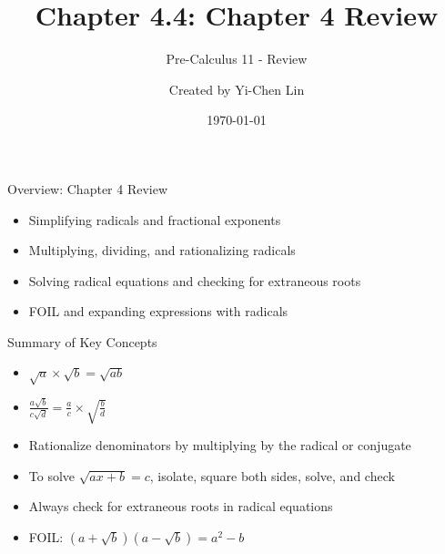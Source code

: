 \documentclass[aspectratio=169]{beamer}
\title{Chapter 4.4: Chapter 4 Review}
\subtitle{Pre-Calculus 11 - Review}
\author{Created by Yi-Chen Lin}
\date{\today}
\begin{document}
\begin{frame}
\titlepage
\end{frame}

\begin{frame}{Overview: Chapter 4 Review}
\begin{tcolorbox}[colback=lightgray,colframe=primary,title=Key Concepts]
\footnotesize
\begin{itemize}
  \item Simplifying radicals and fractional exponents
  \item Multiplying, dividing, and rationalizing radicals
  \item Solving radical equations and checking for extraneous roots
  \item FOIL and expanding expressions with radicals
\end{itemize}
\end{tcolorbox}
\end{frame}

\begin{frame}{Summary of Key Concepts}
\begin{tcolorbox}[colback=lightgray,colframe=primary,title=Summary]
\footnotesize
\begin{itemize}
  \item $\sqrt{a} \times \sqrt{b} = \sqrt{ab}$
  \item $\frac{a\sqrt{b}}{c\sqrt{d}} = \frac{a}{c} \times \sqrt{\frac{b}{d}}$
  \item Rationalize denominators by multiplying by the radical or conjugate
  \item To solve $\sqrt{ax+b} = c$, isolate, square both sides, solve, and check
  \item Always check for extraneous roots in radical equations
  \item FOIL: $(a+\sqrt{b})(a-\sqrt{b}) = a^2-b$
\end{itemize}
\end{tcolorbox}
\end{frame}
\end{document}

